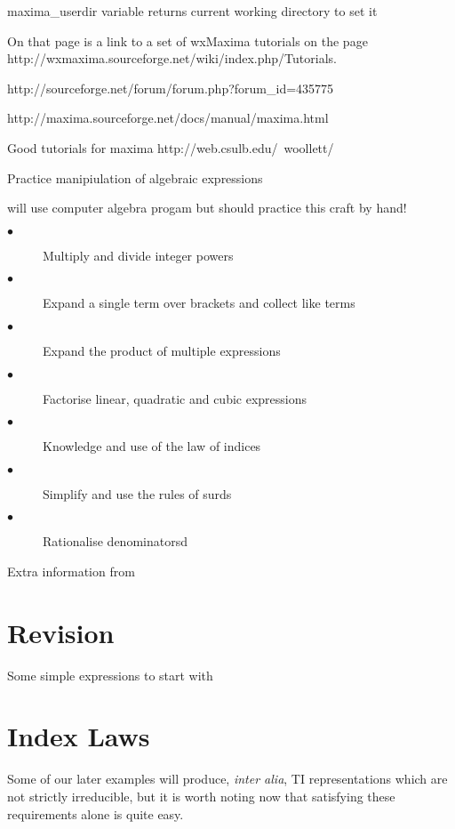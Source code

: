 \documentclass[11pt]{article}
\begin{document}
maxima_userdir   variable returns current working directory to set it

On that page is a link to a set of wxMaxima tutorials on the page
http://wxmaxima.sourceforge.net/wiki/index.php/Tutorials.


http://sourceforge.net/forum/forum.php?forum_id=435775



http://maxima.sourceforge.net/docs/manual/maxima.html




Good tutorials for maxima
http://web.csulb.edu/~woollett/

Practice manipiulation of algebraic expressions

will use computer algebra progam but should practice this craft by hand!


\begin{description}
\item[$\bullet$] Multiply and divide integer powers
\item[$\bullet$] Expand a single term over brackets and collect like terms
\item[$\bullet$] Expand the product of multiple expressions
\item[$\bullet$] Factorise linear, quadratic and cubic expressions
\item[$\bullet$] Knowledge and use of the law of indices
\item[$\bullet$] Simplify and use the rules of surds
\item[$\bullet$] Rationalise denominatorsd
\end{description}

Extra information from \cite{khanacademyalgebra1}


\section{Revision}\label{S2}

Some simple expressions to start with


\section{Index Laws}\label{S3}

Some of our later examples will produce, {\em inter alia}, TI representations
which are not strictly irreducible, but it is worth noting now that
satisfying these requirements alone is quite easy.
\end{document}
